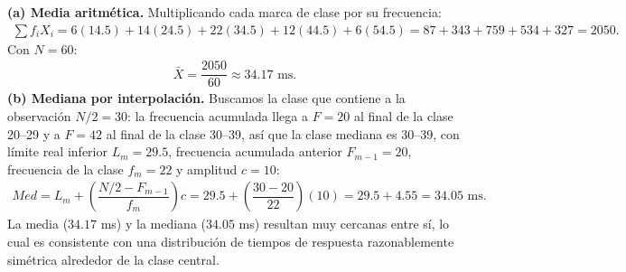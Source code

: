 \begin{solproblema}[prob:32476e7]
	\textbf{(a) Media aritmética.} Multiplicando cada marca de clase por su frecuencia:
	\begin{align}
		\sum f_iX_i = 6(14.5)+14(24.5)+22(34.5)+12(44.5)+6(54.5) = 87+343+759+534+327 = 2050.
	\end{align}
	Con $N=60$:
	\begin{align}
		\bar{X} = \dfrac{2050}{60} \approx 34.17 \text{ ms.}
	\end{align}
	\textbf{(b) Mediana por interpolación.} Buscamos la clase que contiene a la observación $N/2=30$: la frecuencia acumulada llega a $F=20$ al final de la clase 20--29 y a $F=42$ al final de la clase 30--39, así que la clase mediana es 30--39, con límite real inferior $L_m=29.5$, frecuencia acumulada anterior $F_{m-1}=20$, frecuencia de la clase $f_m=22$ y amplitud $c=10$:
	\begin{align}
		Med = L_m + \left( \dfrac{N/2 - F_{m-1}}{f_m} \right)c = 29.5 + \left( \dfrac{30-20}{22} \right)(10) = 29.5 + 4.55 = 34.05 \text{ ms.}
	\end{align}
	La media ($34.17$ ms) y la mediana ($34.05$ ms) resultan muy cercanas entre sí, lo cual es consistente con una distribución de tiempos de respuesta razonablemente simétrica alrededor de la clase central.
\end{solproblema}
